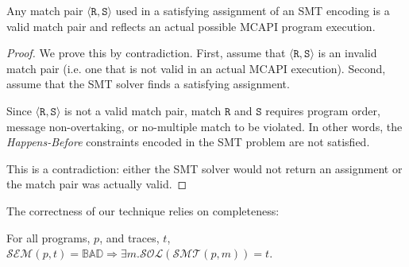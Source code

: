 \begin{lemma} \label{lem:bogus}
Any match pair $\langle \mathtt{R}, \mathtt{S}\rangle$ used in a
satisfying assignment of an SMT encoding is a valid match pair and
reflects an actual possible MCAPI program execution.
\end{lemma}
\begin{proof}
We prove this by contradiction. First, assume that $\langle
\mathtt{R}, \mathtt{S}\rangle$ is an invalid match pair (i.e. one that
is not valid in an actual MCAPI execution). Second, assume that the
SMT solver finds a satisfying assignment.

Since $\langle \mathtt{R}, \mathtt{S}\rangle$ is not a valid match
pair, match $\mathtt{R}$ and $\mathtt{S}$ requires program order,
message non-overtaking, or no-multiple match to be violated. In other
words, the \emph{Happens-Before} constraints encoded in the SMT
problem are not satisfied.

This is a contradiction: either the SMT solver would not return an
assignment or the match pair was actually valid.
\end{proof}

The correctness of our technique relies on completeness:

\begin{theorem}[Completeness]
For all programs, $p$, and traces, $t$, $\mathcal{SEM}(p, t) =
\mathbb{BAD} \Rightarrow \exists m . \mathcal{SOL}(\mathcal{SMT}(p,
m)) = t$.
\end{theorem}

